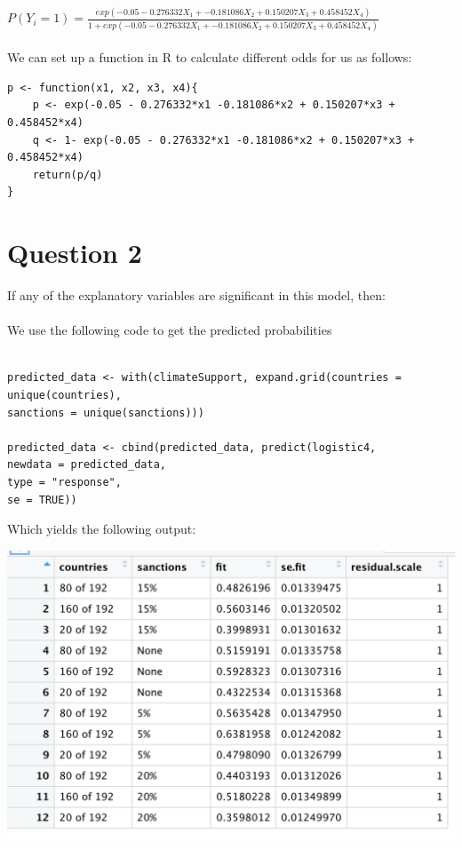 \documentclass[12pt,letterpaper]{article}
\begin{document}
$ P(Y_i = 1) = \frac{exp( -0.05 -0.276332X_1 + -0.181086X_2 + 0.150207X_3 + 0.458452X_4)}{1 + exp( -0.05 -0.276332X_1 + -0.181086X_2 + 0.150207X_3 + 0.458452X_4)}$
\\\\
\noindent We can set up a function in R to calculate different odds for us as follows:

\begin{verbatim}
p <- function(x1, x2, x3, x4){
	p <- exp(-0.05 - 0.276332*x1 -0.181086*x2 + 0.150207*x3 + 0.458452*x4)
	q <- 1- exp(-0.05 - 0.276332*x1 -0.181086*x2 + 0.150207*x3 + 0.458452*x4)
	return(p/q)
}
\end{verbatim}

\newpage
\section*{Question 2}

\noindent
If any of the explanatory variables are significant in this model, then:
\\\\

\noindent 
We use the following code to get the predicted probabilities

\begin{verbatim}

predicted_data <- with(climateSupport, expand.grid(countries = unique(countries),
sanctions = unique(sanctions)))

predicted_data <- cbind(predicted_data, predict(logistic4, 
newdata = predicted_data,
type = "response",
se = TRUE))
\end{verbatim}

\noindent Which yields the following output:

\includegraphics{predicted probabilities.png}
\end{document}

